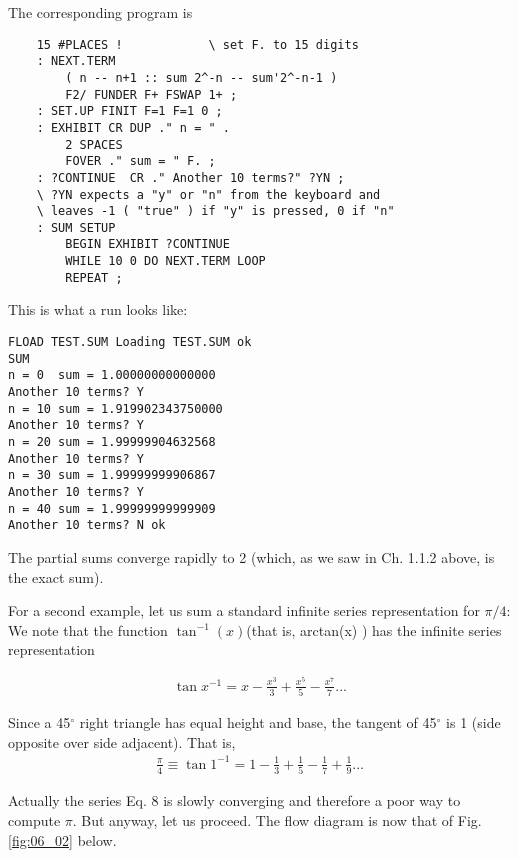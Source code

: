 The corresponding program is

\begin{lstlisting}
    15 #PLACES !            \ set F. to 15 digits
    : NEXT.TERM
        ( n -- n+1 :: sum 2^-n -- sum'2^-n-1 )
        F2/ FUNDER F+ FSWAP 1+ ;
    : SET.UP FINIT F=1 F=1 0 ;
    : EXHIBIT CR DUP ." n = " .
        2 SPACES
        FOVER ." sum = " F. ;
    : ?CONTINUE  CR ." Another 10 terms?" ?YN ;
    \ ?YN expects a "y" or "n" from the keyboard and
    \ leaves -1 ( "true" ) if "y" is pressed, 0 if "n"
    : SUM SETUP
        BEGIN EXHIBIT ?CONTINUE
        WHILE 10 0 DO NEXT.TERM LOOP
        REPEAT ;
\end{lstlisting}

This is what a run looks like:

\begin{lstlisting}
FLOAD TEST.SUM Loading TEST.SUM ok
SUM
n = 0  sum = 1.00000000000000
Another 10 terms? Y
n = 10 sum = 1.919902343750000
Another 10 terms? Y
n = 20 sum = 1.99999904632568
Another 10 terms? Y
n = 30 sum = 1.99999999906867
Another 10 terms? Y
n = 40 sum = 1.99999999999909
Another 10 terms? N ok
\end{lstlisting}

The partial sums converge rapidly to 2 (which, as we saw in Ch. 1.1.2 above, is the exact sum).

For a second example, let us sum a standard infinite series representation for $\pi/4$: We note that the function $\tan^{-1}(x)$(that is, arctan(x) ) has the infinite series representation

\begin{align}
    \tan{x}^{-1} = x - \frac{x^{3}}{3} + \frac{x^{5}}{5} - \frac{x^{7}}{7} ...
\end{align}

Since a 45$^{\circ}$ right triangle has equal height and base, the tangent of 45$^{\circ}$ is 1 (side opposite over side adjacent). That is,
\begin{align}
    \frac{\pi}{4} \equiv \tan{1}^{-1} = 1 - \frac{1}{3} + \frac{1}{5} - \frac{1}{7} + \frac{1}{9}...
\end{align}

Actually the series Eq. 8 is slowly converging and therefore a poor way to compute $\pi$. But anyway, let us proceed. The flow diagram is now that of Fig. \ref{fig:06_02} below.

